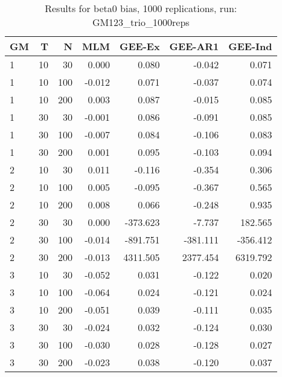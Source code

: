 \begin{table}[ht]
\centering
\begin{tabular}{lrrrrrr}
  \hline
GM & T & N & MLM & GEE-Ex & GEE-AR1 & GEE-Ind \\ 
  \hline
1 & 10 & 30 & 0.000 & 0.080 & -0.042 & 0.071 \\ 
  1 & 10 & 100 & -0.012 & 0.071 & -0.037 & 0.074 \\ 
  1 & 10 & 200 & 0.003 & 0.087 & -0.015 & 0.085 \\ 
  1 & 30 & 30 & -0.001 & 0.086 & -0.091 & 0.085 \\ 
  1 & 30 & 100 & -0.007 & 0.084 & -0.106 & 0.083 \\ 
  1 & 30 & 200 & 0.001 & 0.095 & -0.103 & 0.094 \\ 
  2 & 10 & 30 & 0.011 & -0.116 & -0.354 & 0.306 \\ 
  2 & 10 & 100 & 0.005 & -0.095 & -0.367 & 0.565 \\ 
  2 & 10 & 200 & 0.008 & 0.066 & -0.248 & 0.935 \\ 
  2 & 30 & 30 & 0.000 & -373.623 & -7.737 & 182.565 \\ 
  2 & 30 & 100 & -0.014 & -891.751 & -381.111 & -356.412 \\ 
  2 & 30 & 200 & -0.013 & 4311.505 & 2377.454 & 6319.792 \\ 
  3 & 10 & 30 & -0.052 & 0.031 & -0.122 & 0.020 \\ 
  3 & 10 & 100 & -0.064 & 0.024 & -0.121 & 0.024 \\ 
  3 & 10 & 200 & -0.051 & 0.039 & -0.111 & 0.035 \\ 
  3 & 30 & 30 & -0.024 & 0.032 & -0.124 & 0.030 \\ 
  3 & 30 & 100 & -0.030 & 0.028 & -0.128 & 0.027 \\ 
  3 & 30 & 200 & -0.023 & 0.038 & -0.120 & 0.037 \\ 
   \hline
\end{tabular}
\caption{Results for beta0 bias, 1000 replications, run: GM123_trio_1000reps} 
\label{tab:beta0_bias}
\end{table}
